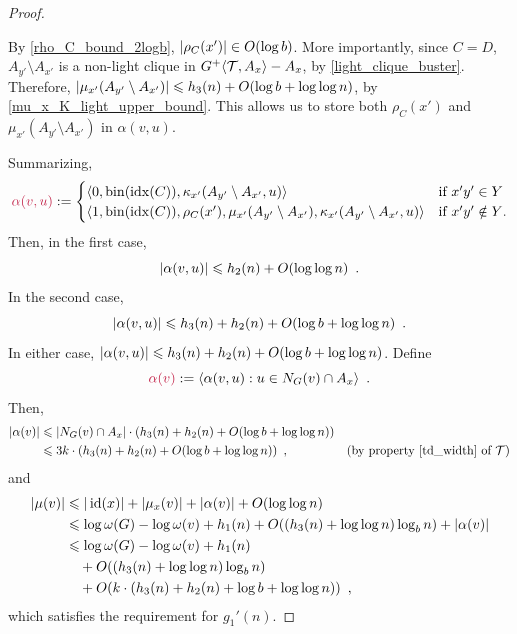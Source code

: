 \begin{proof}
\begin{itemize}
    By \cref{rho_C_bound_2logb}, $|\rho_C(x')|\in O(\log b)$.  More importantly, since $C=D$, $A_{y'}\setminus A_{x'}$ is a non-light clique in ${G^+}\langle{\mathcal{T},A_x}\rangle-A_x$, by \ref{light_clique_buster}. Therefore, $|\mu_{x'}(A_{y'}\setminus A_{x'})|\leqslant h_3(n)+ O(\log b +\log\log n)$, by \cref{mu_x_K_light_upper_bound}.  This allows us to store both $\rho_C(x')$ and $\mu_{x'}(A_{y'}\setminus A_{x'})$ in $\alpha(v,u)$.  
  \end{itemize} 
  Summarizing,
  \[
    \mathdefin{\alpha(v,u)} :=
    \begin{cases}
      \langle 0, \bin(\idx(C)), \kappa_{x'}(A_{y'}\setminus A_{x'}, u)\rangle&\text{if } x'y'\in Y \\
      \langle 1, \bin(\idx(C)), \rho_C(x'), \mu_{x'}(A_{y'}\setminus A_{x'}), \kappa_{x'}(A_{y'}\setminus A_{x'}, u)\rangle&\text{if  $x'y'\notin Y$.} 
    \end{cases}
  \]
  Then, in the first case,
  \[
    |\alpha(v,u)| \leqslant h_2(n) + O(\log\log n) \enspace .
  \] 
  In the second case,
  \[
    |\alpha(v,u)| \leqslant h_3(n) + h_2(n)+ O(\log b+\log\log n) \enspace .
  \]
  In either case, $|\alpha(v,u)|\leqslant h_3(n)+h_2(n)+ O(\log b+\log\log n)$.  
  Define
  \[
    \mathdefin{\alpha(v)} := \langle \alpha(v,u):u\in N_G(v)\cap A_x \rangle \enspace .
  \] 
  Then,
  \begin{align*}
    |\alpha(v)| & \leqslant |N_G(v)\cap A_x|\cdot (h_3(n)+h_2(n)+O(\log b+\log\log n)) \\
    & \leqslant 3k\cdot(h_3(n) + h_2(n) + O(\log b+\log\log n) ) \enspace ,
    & \text{(by property~\ref{td_width} of $\mathcal{T}$)}
  \end{align*}
  and 
  \begin{align*}
    |\mu(v)| & \leqslant |\operatorname{id}(x)| + |\mu_x(v)| + |\alpha(v)| + O(\log\log n) \\
     & \leqslant \log \omega(G) - \log \omega(v) + h_1(n) + O((h_3(n)+\log\log n)\log_b n) + |\alpha(v)| \\
     & \leqslant \log \omega(G) - \log \omega(v) + h_1(n) \\
     & \quad + O((h_3(n)+\log\log n)\log_b n) \\
     & \quad + O(k\cdot(h_3(n) + h_2(n) + \log b + \log\log n) ) \enspace ,
  \end{align*}
  which satisfies the requirement for $g_1'(n)$.



\end{proof}
